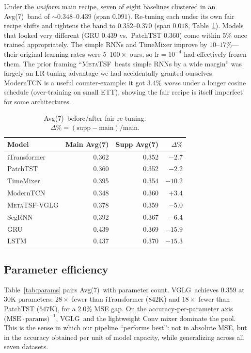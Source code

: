 \documentclass[11pt]{article}
\newcommand{\mtsf}{\textsc{MetaTSF}}
\newcommand{\vglg}{\textsc{VGLG}}
\newcommand{\avgseven}{Avg(7)}
\begin{document}
Under the \emph{uniform} main recipe, seven of eight baselines clustered in an
\avgseven\ band of $\sim\!0.348$--$0.439$ (span $0.091$). Re-tuning each under its
own fair recipe shifts and tightens the band to $0.352$--$0.370$ (span $0.018$,
Table~\ref{tab:recipe-delta}). Models that looked very different (GRU $0.439$ vs.\
PatchTST $0.360$) come within $5\%$ once trained appropriately. The simple RNNs
and TimeMixer improve by $10$--$17\%$---their original learning rates were
$5$--$100\times$ ours, so $\text{lr}{=}10^{-4}$ had effectively frozen them. The
prior framing ``\mtsf\ beats simple RNNs by a wide margin'' was largely an
LR-tuning advantage we had accidentally granted ourselves. ModernTCN is a useful
counter-example: it got $3.4\%$ \emph{worse} under a longer cosine schedule
(over-training on small ETT), showing the fair recipe is itself imperfect for some
architectures.

\begin{table}[t]
\centering
\caption{\avgseven\ before/after fair re-tuning. $\Delta\%=(\text{supp}-\text{main})/\text{main}$.}
\label{tab:recipe-delta}
\small
\begin{tabular}{@{}lrrr@{}}
\toprule
Model & Main \avgseven & Supp \avgseven & $\Delta\%$ \\
\midrule
iTransformer & 0.362 & 0.352 & $-2.7$ \\
PatchTST     & 0.360 & 0.352 & $-2.2$ \\
TimeMixer    & 0.395 & 0.354 & $-10.2$ \\
ModernTCN    & 0.348 & 0.360 & $+3.4$ \\
\mtsf-\vglg  & 0.378 & 0.359 & $-5.0$ \\
SegRNN       & 0.392 & 0.367 & $-6.4$ \\
GRU          & 0.439 & 0.369 & $-15.9$ \\
LSTM         & 0.437 & 0.370 & $-15.3$ \\
\bottomrule
\end{tabular}
\end{table}

\subsection{Parameter efficiency}

Table~\ref{tab:params} pairs \avgseven\ with parameter count. \vglg\ achieves
$0.359$ at $30$K parameters: $28\times$ fewer than iTransformer ($842$K) and
$18\times$ fewer than PatchTST ($547$K), for a $2.0\%$ MSE gap. On the
accuracy-per-parameter axis $\big(\text{MSE}\cdot\text{params}\big)^{-1}$, \vglg\
and the lightweight Conv mixer dominate the pool. This is the sense in which our
pipeline ``performs best'': not in absolute MSE, but in the accuracy obtained per
unit of model capacity, while generalizing across all seven datasets.
\end{document}
